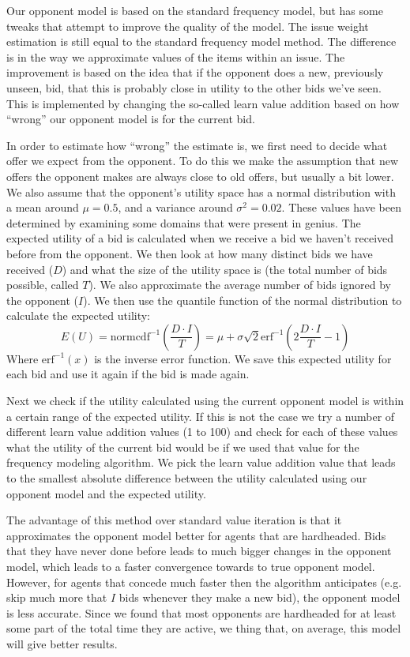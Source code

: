 Our opponent model is based on the standard frequency model, but has some tweaks that attempt to improve the quality of the model. The issue weight estimation is still equal to the standard frequency model method. The difference is in the way we approximate values of the items within an issue. The improvement is based on the idea that if the opponent does a new, previously unseen, bid, that this is probably close in utility to the other bids we've seen. This is implemented by changing the so-called learn value addition based on how ``wrong'' our opponent model is for the current bid. 

In order to estimate how ``wrong'' the estimate is, we first need to decide what offer we expect from the opponent. To do this we make the assumption that new offers the opponent makes are always close to old offers, but usually a bit lower. We also assume that the opponent's utility space has a normal distribution with a mean around $\mu = 0.5$, and a variance around $\sigma^2 = 0.02$. These values have been determined by examining some domains that were present in genius. The expected utility of a bid is calculated when we receive a bid we haven't received before from the opponent. We then look at how many distinct bids we have received ($D$) and what the size of the utility space is (the total number of bids possible, called $T$). We also approximate the average number of bids ignored by the opponent ($I$). We then use the quantile function of the normal distribution to calculate the expected utility:
\begin{equation}
  E(U) = \text{normcdf}^{-1} (\frac{D \cdot I}{T}) = \mu + \sigma \sqrt{2} \text{erf}^{-1} (2 \frac{D \cdot I}{T} - 1)
\end{equation}
Where $\text{erf}^{-1}(x)$ is the inverse error function. We save this expected utility for each bid and use it again if the bid is made again. 

Next we check if the utility calculated using the current opponent model is within a certain range of the expected utility. If this is not the case we try a number of different learn value addition values (1 to 100) and check for each of these values what the utility of the current bid would be if we used that value for the frequency modeling algorithm. We pick the learn value addition value that leads to the smallest absolute difference between the utility calculated using our opponent model and the expected utility.

The advantage of this method over standard value iteration is that it approximates the opponent model better for agents that are hardheaded. Bids that they have never done before leads to much bigger changes in the opponent model, which leads to a faster convergence towards to true opponent model. However, for agents that concede much faster then the algorithm anticipates (e.g. skip much more that $I$ bids whenever they make a new bid), the opponent model is less accurate. Since we found that most opponents are hardheaded for at least some part of the total time they are active, we thing that, on average, this model will give better results.